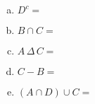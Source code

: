 \documentclass[11pt,letterpaper]{article}
\begin{document}
\sol 
\begin{enumerate}[(a)]
\item $D^c=$
\item $B \cap C=$
\item $A \,\Delta\, C=$
\item $C - B=$
\item $(A \cap D) \cup C=$
\end{enumerate}
\end{document}
